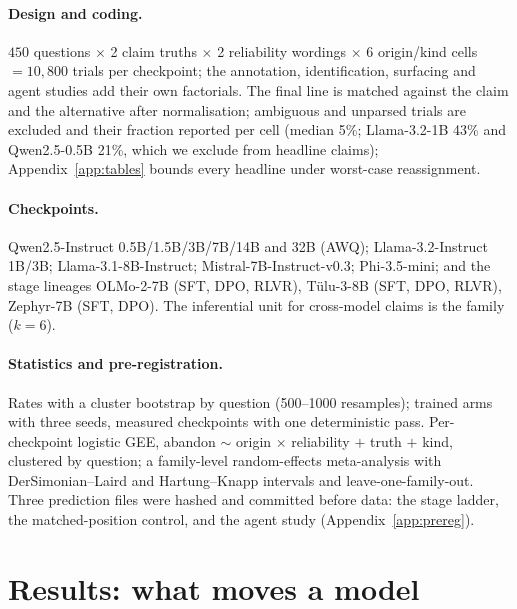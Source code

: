 \documentclass{article}
\begin{document}
\paragraph{Design and coding.} $450$ questions $\times$ 2 claim truths $\times$ 2 reliability wordings $\times$ 6 origin/kind cells $=10{,}800$ trials per checkpoint; the annotation, identification, surfacing and agent studies add their own factorials. The final line is matched against the claim and the alternative after normalisation; ambiguous and unparsed trials are excluded and their fraction reported per cell (median 5\%; Llama-3.2-1B 43\% and Qwen2.5-0.5B 21\%, which we exclude from headline claims); Appendix~\ref{app:tables} bounds every headline under worst-case reassignment.
\paragraph{Checkpoints.} Qwen2.5-Instruct 0.5B/1.5B/3B/7B/14B and 32B (AWQ); Llama-3.2-Instruct 1B/3B; Llama-3.1-8B-Instruct; Mistral-7B-Instruct-v0.3; Phi-3.5-mini; and the stage lineages OLMo-2-7B \citep{olmo2025} (SFT, DPO, RLVR), T\"ulu-3-8B \citep{lambert2024tulu3} (SFT, DPO, RLVR), Zephyr-7B \citep{tunstall2023zephyr} (SFT, DPO). The inferential unit for cross-model claims is the family ($k=6$).
\paragraph{Statistics and pre-registration.} Rates with a cluster bootstrap by question (500--1000 resamples); trained arms with three seeds, measured checkpoints with one deterministic pass. Per-checkpoint logistic GEE, abandon $\sim$ origin $\times$ reliability $+$ truth $+$ kind, clustered by question; a family-level random-effects meta-analysis with DerSimonian--Laird and Hartung--Knapp intervals and leave-one-family-out. Three prediction files were hashed and committed before data: the stage ladder, the matched-position control, and the agent study (Appendix~\ref{app:prereg}).

\section{Results: what moves a model}\label{sec:results}
\end{document}
